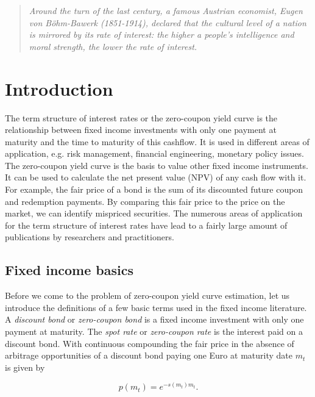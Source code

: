 \begin{quote}
\emph{
  Around the turn of the last century, a famous Austrian economist, Eugen von B\"{o}hm-Bawerk (1851-1914), declared that the cultural level of a nation is  mirrored by its rate of interest: the higher a people's intelligence and moral strength, the lower the rate of interest.}
\\
\end{quote}

\section{Introduction}

The term structure of interest rates or the zero-coupon yield curve is the relationship between fixed income investments with only one payment at maturity and the time to maturity of this cashflow. It is used in different areas of application, e.g. risk management, financial engineering, monetary policy issues. The zero-coupon yield curve is the basis to value other fixed income instruments. It can be used to calculate the net present value (NPV) of any cash flow with it. For example, the fair price of a bond is the sum of its discounted future coupon and redemption payments. By comparing this fair price to the price on the market, we can identify mispriced securities. The numerous areas of application for the term structure of interest rates have lead to a fairly large amount of publications by researchers and practitioners.

\subsection{Fixed income basics}

Before we come to the problem of zero-coupon yield curve estimation, let us introduce the definitions of a few basic terms used in the fixed income literature. A \emph{discount bond} or \emph{zero-coupon bond} is a fixed income investment with only one payment at maturity. The \emph{spot rate} or \emph{zero-coupon rate} is the interest paid on a discount bond. With continuous compounding the fair price in the absence of arbitrage opportunities of a discount bond paying one Euro at maturity date  $m_t$ is given by

\begin{equation}
  \label{eq:pricediscountbond}
  p(m_t)=e^{-s(m_t)m_t}.
\end{equation}

